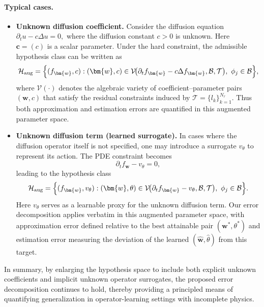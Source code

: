 \documentclass{article}
\theoremstyle{plain}
\theoremstyle{definition}
\theoremstyle{remark}
\begin{document}
\paragraph{Typical cases.}

\begin{itemize}
    \item \textbf{Unknown diffusion coefficient.}\;
    Consider the diffusion equation
    \(
      \partial_{t} u - c \Delta u = 0,
    \)
    where the diffusion constant $c>0$ is unknown.
    Here $\bm{c}=(c)$ is a scalar parameter.  
    Under the hard constraint, the admissible hypothesis class can be written as
    \[
      \mathcal{H}_{\text{aug}}
      = \Bigl\{ (f_{\bm{w}}, c)  :
          (\bm{w},c) \in 
          \mathcal{V}\!\bigl(\partial_{t}f_{\bm{w}} - c\Delta f_{\bm{w}},
                              \mathcal{B},\mathcal{T}\bigr),
          \ \phi_{j}\in\mathcal{B}\Bigr\},
    \]
    where $\mathcal{V}(\cdot)$ denotes the algebraic variety of
    coefficient–parameter pairs $(\bm{w},c)$ that satisfy the residual
    constraints induced by $\mathcal{T}=\{l_{k}\}_{k=1}^{N_{r}}$.
    Thus both approximation and estimation errors are quantified in this
    augmented parameter space.

    \item \textbf{Unknown diffusion term (learned surrogate).}\;
    In cases where the diffusion operator itself is not specified, one
    may introduce a surrogate $v_{\theta}$ to represent its action.
    The PDE constraint becomes
    \[
      \partial_{t} f_{\bm{w}} - v_{\theta} = 0,
    \]
    leading to the hypothesis class
    \[
      \mathcal{H}_{\text{aug}}
      = \Bigl\{ (f_{\bm{w}}, v_{\theta}) :
          (\bm{w},\theta) \in 
          \mathcal{V}\!\bigl(\partial_{t}f_{\bm{w}} - v_{\theta},
                              \mathcal{B},\mathcal{T}\bigr),
          \ \phi_{j}\in\mathcal{B}\Bigr\}.
    \]
    Here $v_{\theta}$ serves as a learnable proxy for the unknown
    diffusion term.  
    Our error decomposition applies verbatim in this augmented parameter
    space, with approximation error defined relative to the best attainable
    pair $(\bm{w}^{\ast},\theta^{\ast})$ and estimation error measuring the
    deviation of the learned $(\hat{\bm{w}},\hat{\theta})$ from this target.
\end{itemize}

In summary, by enlarging the hypothesis space to include both explicit
unknown coefficients and implicit unknown operator surrogates, the
proposed error decomposition continues to hold, thereby providing a
principled means of quantifying generalization in operator-learning
settings with incomplete physics.
\end{document}
